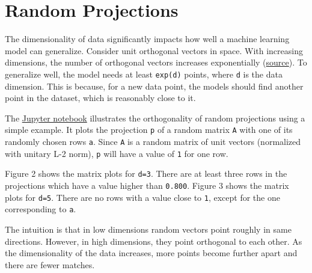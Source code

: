 \chapter{Random Projections}
The dimensionality of data significantly impacts how well a machine learning model can generalize.
Consider unit orthogonal vectors in space.
With increasing dimensions, the number of orthogonal vectors increases exponentially (\href{https://www.cs.princeton.edu/courses/archive/fall15/cos521/lecnotes/lec12.pdf}{source}).
To generalize well, the model needs at least \texttt{exp(d)} points, where \texttt{d} is the data dimension.
This is because, for a new data point, the models should find another point in the dataset, which is reasonably close to it. 

The \href{https://github.com/Atcold/pytorch-Deep-Learning-Minicourse/blob/master/extra/a-projections.ipynb}{Jupyter notebook} illustrates the orthogonality of random projections using a simple example.
It plots the projection \texttt{p} of a random matrix \texttt{A} with one of its randomly chosen rows \texttt{a}.
Since \texttt{A} is a random matrix of unit vectors (normalized with unitary L-2 norm), \texttt{p} will have a value of \texttt{1} for one row. 

Figure 2 shows the matrix plots for \texttt{d=3}.
There are at least three rows in the projections which have a value higher than \texttt{0.800}.
Figure 3 shows the matrix plots for \texttt{d=5}.
There are no rows with a value close to \texttt{1}, except for the one corresponding to \texttt{a}.

The intuition is that in low dimensions random vectors point roughly in same directions.
However, in high dimensions, they point orthogonal to each other.
As the dimensionality of the data increases, more points become further apart and there are fewer matches.

